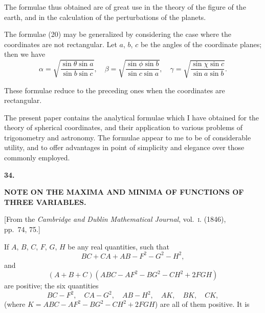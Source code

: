 \documentclass[11pt,a4paper]{article}
\begin{document}
The formulae thus obtained are of great use in the theory of the figure of the
earth, and in the calculation of the perturbations of the planets.

\newpage
\setcounter{page}{225}

The formulae (20) may be generalized by considering the case where the
coordinates are not rectangular. Let $a$, $b$, $c$ be the angles of the coordinate planes;
then we have
\[
\alpha = \sqrt{\frac{\sin\theta \sin a}{\sin b \sin c}}, \quad \beta = \sqrt{\frac{\sin\phi \sin b}{\sin c \sin a}}, \quad \gamma = \sqrt{\frac{\sin\chi \sin c}{\sin a \sin b}}.
\]

These formulae reduce to the preceding ones when the coordinates are rectangular.

\newpage
\setcounter{page}{226}

The present paper contains the analytical formulae which I have obtained for
the theory of spherical coordinates, and their application to various problems of
trigonometry and astronomy. The formulae appear to me to be of considerable utility,
and to offer advantages in point of simplicity and elegance over those commonly
employed.


\newpage
{}
\setcounter{page}{227}

\begin{center}
{\large\bfseries 34.}
\end{center}
\vspace{0.5em}
\begin{center}
{\large\bfseries NOTE ON THE MAXIMA AND MINIMA OF FUNCTIONS OF\\[0.3em]
THREE VARIABLES.}
\end{center}
\vspace{0.5em}
\begin{center}
{[From the \textit{Cambridge and Dublin Mathematical Journal}, vol.~\textsc{i}. (1846),\\
pp.~74, 75.]}
\end{center}
\vspace{1em}

If $A$, $B$, $C$, $F$, $G$, $H$ be any real quantities, such that
\[
BC + CA + AB - F^2 - G^2 - H^2,
\]
and
\[
(A+B+C)(ABC - AF^2 - BG^2 - CH^2 + 2FGH)
\]
are positive; the six quantities
\[
BC-F^2, \quad CA-G^2, \quad AB-H^2, \quad AK, \quad BK, \quad CK,
\]
(where $K = ABC - AF^2 - BG^2 - CH^2 + 2FGH$) are all of them positive. It is
\end{document}
